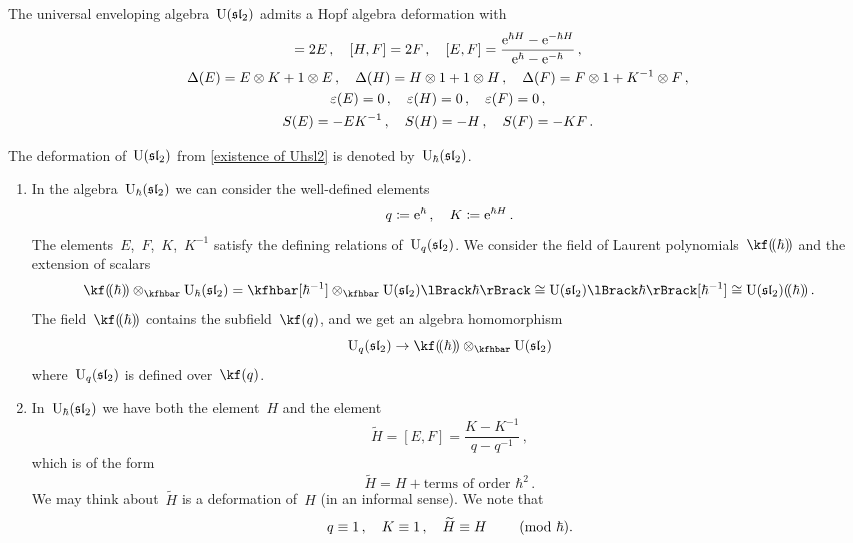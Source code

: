 \documentclass[a4paper, 11pt, oneside]{scrartcl}
\begin{document}
\begin{theorem}
  The universal enveloping algebra~$\operatorname{U}(\mathfrak{sl}_2)$ admits a Hopf algebra deformation with
  \begin{gather*}
    [H, E] = 2E \,,
    \quad
    [H, F] = 2F \,,
    \quad
    [E, F]
    =
    \frac{ \e^{\hbar H} - \e^{-\hbar H} }{ \e^{\hbar} - \e^{-\hbar} } \,,
    \\
    \Delta(E) = E \tensor K + 1 \tensor E \,,
    \quad
    \Delta(H) = H \tensor 1 + 1 \tensor H \,,
    \quad
    \Delta(F) = F \tensor 1 + K^{-1} \tensor F \,,
    \\
    \varepsilon(E) = 0 \,,
    \quad
    \varepsilon(H) = 0 \,,
    \quad
    \varepsilon(F) = 0 \,,
    \\
    S(E) = -E K^{-1} \,,
    \quad
    S(H) = -H \,,
    \quad
    S(F) = -K F \,.
  \end{gather*}
\end{theorem}

\begin{definition}
  The deformation of~$\operatorname{U}(\mathfrak{sl}_2)$ from \cref{existence of Uhsl2} is denoted by~$\operatorname{U}_{\hbar}(\mathfrak{sl}_2)$.
\end{definition}

\begin{remark}
  \leavevmode
  \begin{enumerate}
    \item
      In the algebra~$\operatorname{U}_{\hbar}(\mathfrak{sl}_2)$ we can consider the well-defined elements
      \[
        q \coloneqq \mathrm{e}^{\hbar} \,,
        \quad
        K \coloneqq \mathrm{e}^{\hbar H} \,.
      \]
      The elements~$E$,~$F$,~$K$,~$K^{-1}$ satisfy the defining relations of~$\operatorname{U}_q(\mathfrak{sl}_2)$.
      We consider the field of Laurent polynomials~$\lpower{\kf}{\hbar}$ and the extension of scalars
      \[
        \lpower{\kf}{\hbar} \tensor_{\kfhbar} \Univ_{\hbar}(\sllie_2)
        =
        \kfhbar[\hbar^{-1}] \tensor_{\kfhbar} \power{\Univ(\sllie_2)}{\hbar}
        \cong
        \power{\Univ(\sllie_2)}{\hbar}[\hbar^{-1}]
        \cong
        \lpower{\Univ(\sllie_2)}{\hbar} \,.
      \]
      The field~$\lpower{\kf}{\hbar}$ contains the subfield~$\kf(q)$, and we get an algebra homomorphism
      \[
        \Univ_q(\sllie_2)
        \to
        \lpower{\kf}{\hbar} \tensor_{\kfhbar} \Univ(\sllie_2)
      \]
      where~$\operatorname{U}_q(\mathfrak{sl}_2)$ is defined over~$\kf(q)$.
    \item
      In~$\operatorname{U}_{\hbar}(\mathfrak{sl}_2)$ we have both the element~$H$ and the element
      \[
        \widetilde{H}
        =
        [E,F]
        =
        \frac{K - K^{-1}}{q - q^{-1}} \,,
      \]
      which is of the form
      \[
        \widetilde{H}
        =
        H + \text{terms of order~$\hbar^2$} \,.
      \]
      We may think about~$\widetilde{H}$ is a deformation of~$H$ (in an informal sense).
      We note that
      \[
        q \equiv 1 \,,
        \quad
        K \equiv 1 \,,
        \quad
        \widetilde{H} \equiv H
        \qquad
        \ (\mathrm{mod}\ \hbar).
      \]
  \end{enumerate}
\end{remark}
\end{document}
